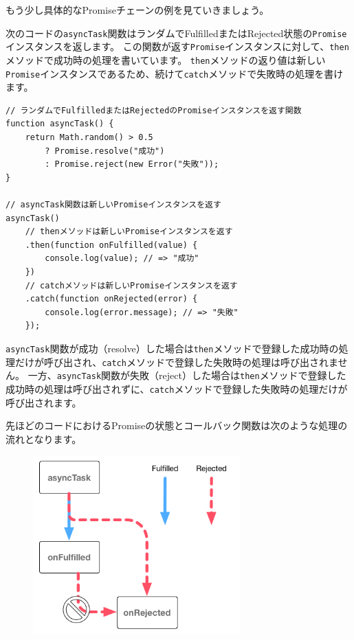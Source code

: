 もう少し具体的なPromiseチェーンの例を見ていきましょう。

次のコードの\texttt{asyncTask}関数はランダムでFulfilledまたはRejected状態の\texttt{Promise}インスタンスを返します。
この関数が返す\texttt{Promise}インスタンスに対して、\texttt{then}メソッドで成功時の処理を書いています。
\texttt{then}メソッドの返り値は新しい\texttt{Promise}インスタンスであるため、続けて\texttt{catch}メソッドで失敗時の処理を書けます。

\begin{lstlisting}
// ランダムでFulfilledまたはRejectedのPromiseインスタンスを返す関数
function asyncTask() {
    return Math.random() > 0.5 
        ? Promise.resolve("成功")
        : Promise.reject(new Error("失敗"));
}

// asyncTask関数は新しいPromiseインスタンスを返す
asyncTask()
    // thenメソッドは新しいPromiseインスタンスを返す
    .then(function onFulfilled(value) {　
        console.log(value); // => "成功"
    })
    // catchメソッドは新しいPromiseインスタンスを返す
    .catch(function onRejected(error) {
        console.log(error.message); // => "失敗"
    });
\end{lstlisting}

\texttt{asyncTask}関数が成功（resolve）した場合は\texttt{then}メソッドで登録した成功時の処理だけが呼び出され、\texttt{catch}メソッドで登録した失敗時の処理は呼び出されません。
一方、\texttt{asyncTask}関数が失敗（reject）した場合は\texttt{then}メソッドで登録した成功時の処理は呼び出されずに、\texttt{catch}メソッドで登録した失敗時の処理だけが呼び出されます。

先ほどのコードにおけるPromiseの状態とコールバック関数は次のような処理の流れとなります。

\begin{figure}[h]
\centering
\includegraphics[width=80mm]{fig/promise-chain.png}
\end{figure}

